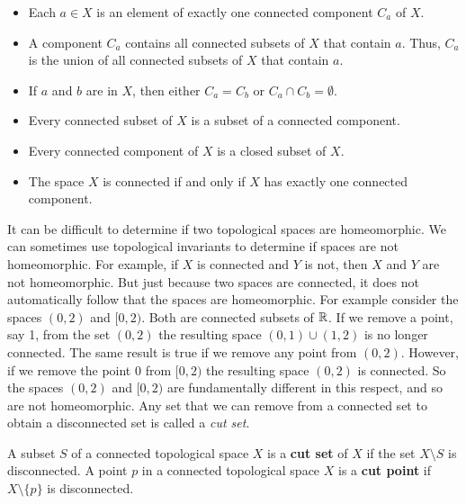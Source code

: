 \begin{itemize}
\item Each $a \in X$ is an element of exactly one connected component $C_a$ of $X$.
\item A component $C_a$ contains all connected subsets of $X$ that contain $a$. Thus, $C_a$ is the union of all connected subsets of $X$ that contain $a$. 
\item If $a$ and $b$ are in $X$, then either $C_a = C_b$ or $C_a \cap C_b = \emptyset$. 
\item Every connected subset of $X$ is a subset of a connected component.
\item Every connected component of $X$ is a closed subset of $X$. %
\item The space $X$ is connected if and only if $X$ has exactly one connected component.
\end{itemize}
 



It can be difficult to determine if two topological spaces are homeomorphic. We can sometimes use topological invariants to determine if spaces are not homeomorphic. For example, if $X$ is connected and $Y$ is not, then $X$ and $Y$ are not homeomorphic. But just because two spaces are connected, it does not automatically follow that the spaces are homeomorphic. For example consider the spaces $(0,2)$ and $[0,2)$. Both are connected subsets of $\mathbb{R}$. If we remove a point, say 1, from the set $(0,2)$ the resulting space $(0,1) \cup (1,2)$ is no longer connected. The same result is true if we remove any point from $(0,2)$. However, if we remove the point $0$ from $[0,2)$ the resulting space $(0,2)$ is connected. So the spaces $(0,2)$ and $[0,2)$ are fundamentally different in this respect, and so are not homeomorphic. Any set that we can remove from a connected set to obtain a disconnected set is called a \emph{cut set}.

\begin{definition} A subset $S$ of a connected topological space $X$ is a \textbf{cut set} of $X$ if the set $X \setminus S$ is disconnected. A point $p$ in a connected topological space $X$ is a \textbf{cut point} if $X \setminus \{p\}$ is disconnected.
\end{definition}


